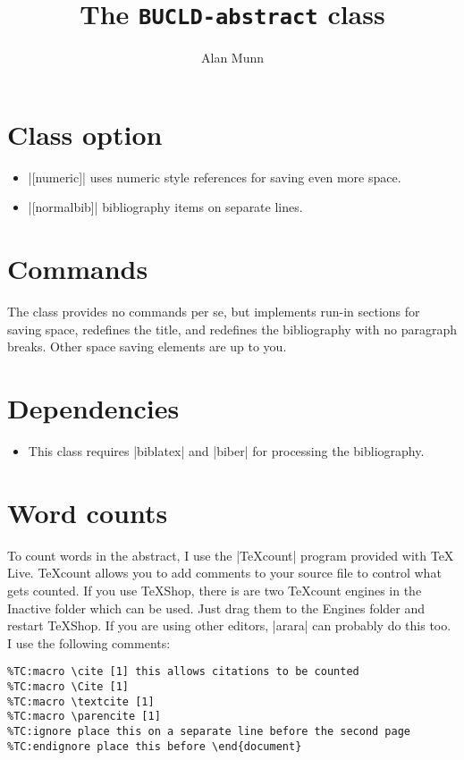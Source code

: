\documentclass[12pt]{article}
\title{The \texttt{BUCLD-abstract} class}
\author{Alan Munn}
\begin{document}
\maketitle
\section{Class option}
\begin{itemize}
\item |[numeric]| uses numeric style references for saving even more 
space.
\item |[normalbib]| bibliography items on separate lines.
\end{itemize}
\section{Commands}
The class provides no commands per se, but implements run-in sections for saving space, redefines the title, and redefines the bibliography with no paragraph breaks.  Other space saving elements are up to you.

\section{Dependencies}
\begin{itemize}
\item This class requires |biblatex| and |biber| for processing the bibliography.
\end{itemize}
\section{Word counts}
To count words in the abstract, I use the |TeXcount| program provided with TeX Live. TeXcount allows you to add comments to your source file to control what gets counted. If you use TeXShop, there is are two TeXcount engines in the Inactive folder which can be used. Just drag them to the Engines folder and restart TeXShop.  If you are using other editors, |arara| can probably do this too.  I use the following comments:
\begin{Verbatim}
%TC:macro \cite [1] this allows citations to be counted
%TC:macro \Cite [1]
%TC:macro \textcite [1]
%TC:macro \parencite [1]
%TC:ignore place this on a separate line before the second page
%TC:endignore place this before \end{document}
\end{Verbatim}
\end{document}
